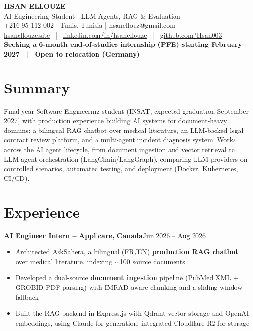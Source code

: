 \documentclass[10pt,a4paper]{article}
\newcommand{\entry}[2]{\vspace{1pt}\noindent\textbf{#1}\hfill{\color{muted}#2}\par}
\begin{document}
\begin{center}
  {\LARGE\bfseries HSAN ELLOUZE}\\[2pt]
  {\color{muted} AI Engineering Student | LLM Agents, RAG \& Evaluation}\\[2pt]
  {\footnotesize +216 95 112 002 | Tunis, Tunisia | hsanellouz@gmail.com}\\[1pt]
  {\footnotesize \href{https://hsanellouze.site}{hsanellouze.site} \ | \ \href{https://linkedin.com/in/hsanellouze}{linkedin.com/in/hsanellouze} \ | \ \href{https://github.com/Hsan003}{github.com/Hsan003}}\\[3pt]
  {\footnotesize\bfseries Seeking a 6-month end-of-studies internship (PFE) starting February 2027 \ | \ Open to relocation (Germany)}
\end{center}

\section{Summary}
Final-year Software Engineering student (INSAT, expected graduation September 2027) with production experience building AI systems for document-heavy domains: a bilingual RAG chatbot over medical literature, an LLM-backed legal contract review platform, and a multi-agent incident diagnosis system. Works across the AI agent lifecycle, from document ingestion and vector retrieval to LLM agent orchestration (LangChain/LangGraph), comparing LLM providers on controlled scenarios, automated testing, and deployment (Docker, Kubernetes, CI/CD).

\section{Experience}
\entry{AI Engineer Intern -- Applicare, Canada}{Jun 2026 -- Aug 2026}
\begin{itemize}
  \item Architected AskSahera, a bilingual (FR/EN) \textbf{production RAG chatbot} over medical literature, indexing $\sim$100 source documents
  \item Developed a dual-source \textbf{document ingestion} pipeline (PubMed XML + GROBID PDF parsing) with IMRAD-aware chunking and a sliding-window fallback
  \item Built the RAG backend in Express.js with Qdrant vector storage and OpenAI embeddings, using Claude for generation; integrated Cloudflare R2 for storage
\end{itemize}
\end{document}
